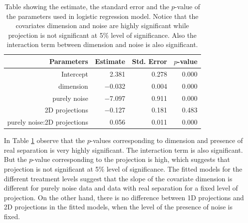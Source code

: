 \begin{table}[ht]
\begin{center}
\caption{Table showing the estimate, the standard error and the $p$-value of the parameters used in logistic regression model. Notice that the covariates dimension and noise are highly significant while projection is not significant at 5\% level of significance. Also the interaction term between dimension and noise is also significant.}
\vspace{0.15cm}
\begin{tabular}{r|rrr}
\hline
  \hline
 Parameters & Estimate & Std. Error  & $p$-value \\ 
  \hline
Intercept  & 2.381 & 0.278  & 0.000 \\ 
  dimension & $-$0.032 & 0.004  & 0.000 \\ 
  purely noise & $-$7.097 & 0.911  & 0.000 \\ 
  2D projections & $-$0.127 & 0.181  & 0.483 \\ 
  purely noise:2D projections & 0.056 & 0.011 & 0.000\\
   \hline
\end{tabular}
\label{params}
\end{center}
\end{table}

In Table \ref{params} observe that the $p$-values corresponding to dimension and presence of real separation is very highly significant. The interaction term is also significant. But the $p$-value corresponding to the projection is high, which suggests that projection is not significant at 5\% level of significance. The fitted models for the different treatment levels suggest that the slope of the covariate dimension is different for purely noise data and data with real separation for a fixed level of projection. On the other hand, there is no difference between 1D projections and 2D projections in the fitted models, when the level of the presence of noise is fixed. 

%
 

